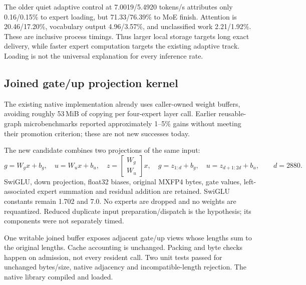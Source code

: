 The older quiet adaptive control at 7.0019/5.4920 tokens/s attributes only
0.16/0.15\% to expert loading, but 71.33/76.39\% to MoE finish.
Attention is 20.46/17.20\%, vocabulary output 4.96/3.57\%, and
unclassified work 2.21/1.92\%. These are inclusive process timings.
Thus larger local storage targets long exact delivery, while faster expert
computation targets the existing adaptive track. Loading is not the
universal explanation for every inference rate.

\subsection{Joined gate/up projection kernel}
The existing native implementation already uses caller-owned weight buffers,
avoiding roughly 53\,MiB of copying per four-expert layer call. Earlier
reusable-graph microbenchmarks reported approximately 1--5\% gains without
meeting their promotion criterion; these are not new successes today.

The new candidate combines two projections of the same input:
\[
 g=W_gx+b_g,\quad u=W_ux+b_u,\quad
 z=\begin{bmatrix}W_g\\W_u\end{bmatrix}x,
 \quad g=z_{1:d}+b_g,\quad u=z_{d+1:2d}+b_u,
 \qquad d=2880.
\]
SwiGLU, down projection, float32 biases, original MXFP4 bytes, gate values,
left-associated expert summation and residual addition are retained.
SwiGLU constants remain 1.702 and 7.0. No experts are dropped and no weights
are requantized. Reduced duplicate input preparation/dispatch is the
hypothesis; its components were not separately timed.

One writable joined buffer exposes adjacent gate/up views whose lengths sum
to the original lengths. Cache accounting is unchanged. Packing and byte
checks happen on admission, not every resident call. Two unit tests passed
for unchanged bytes/size, native adjacency and incompatible-length rejection.
The native library compiled and loaded.

